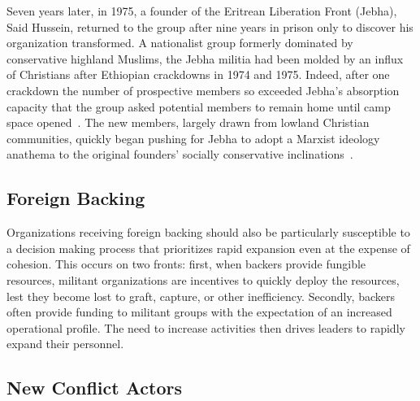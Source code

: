 Seven years later, in 1975, a founder of the Eritrean Liberation Front (Jebha), Said Hussein, returned to the group after nine years in prison only to discover his organization transformed.  A nationalist group formerly dominated by conservative highland Muslims, the Jebha militia had been molded by an influx of Christians after Ethiopian crackdowns in 1974 and 1975. Indeed, after one crackdown the number of prospective members so exceeded Jebha's absorption capacity that the group asked potential members to remain home until camp space opened~\autocite[155]{woldemariam2016battlefield}. The new members, largely drawn from lowland Christian communities, quickly began pushing for Jebha to adopt a Marxist ideology anathema to the original founders' socially conservative inclinations~\autocite[111]{woldemariam2018insurgent}. 

\subsection{Foreign Backing}

Organizations receiving foreign backing should also be particularly susceptible to a decision making process that prioritizes rapid expansion even at the expense of cohesion. This occurs on two fronts: first, when backers provide fungible resources, militant organizations are incentives to quickly deploy the resources, lest they become lost to graft, capture, or other inefficiency. Secondly, backers often provide funding to militant groups with the expectation of an increased operational profile. The need to increase activities then drives leaders to rapidly expand their personnel. 

\subsection{New Conflict Actors}

